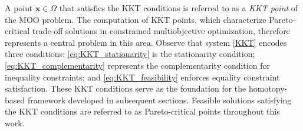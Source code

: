 \documentclass[11pt,pdflatex,sn-mathphys-ay]{sn-jnl}%
\theoremstyle{definition}
\theoremstyle{thmstyleone}%
\theoremstyle{thmstyletwo}%
\theoremstyle{thmstylethree}%
\begin{document}
	A point \( \bm{x} \in \Omega \) that satisfies the KKT conditions is referred to as a \textit{KKT point} of the MOO problem. 
	The computation of KKT points, which characterize Pareto-critical trade-off solutions in constrained multiobjective optimization, therefore represents a central problem in this area. 
	Observe that system \eqref{KKT} encodes three conditions: \eqref{eq:KKT_stationarity} is the stationarity condition; \eqref{eq:KKT_complementarity} represents the complementarity condition for inequality constraints; and \eqref{eq:KKT_feasibility} enforces equality constraint satisfaction. These KKT conditions serve as the foundation for the homotopy-based framework developed in subsequent sections. Feasible solutions satisfying the KKT conditions are referred to as Pareto-critical points throughout this work.
	
	
	
\end{document}
